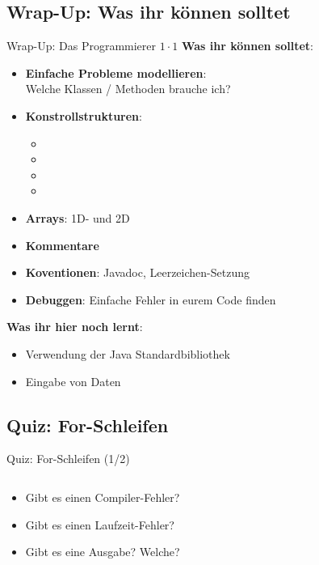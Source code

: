 \documentclass[usepdftitle=false,hyperref={pdfpagelabels=false}]{beamer}
\begin{document}
\subsection{Wrap-Up: Was ihr können solltet}
\begin{frame}{Wrap-Up: Das Programmierer $1 \cdot 1$}
    \textbf{Was ihr können solltet}:
    \begin{itemize}
        \item \textbf{Einfache Probleme modellieren}:\\
              Welche Klassen / Methoden brauche ich?
        \item \textbf{Konstrollstrukturen}:
          \begin{itemize}
            \item {} 
            \item {}
            \item {}
            \item {}
          \end{itemize}
        \item \textbf{Arrays}: 1D- und 2D
        \item \textbf{Kommentare}
        \item \textbf{Koventionen}: Javadoc, Leerzeichen-Setzung
        \item \textbf{Debuggen}: Einfache Fehler in eurem Code finden
    \end{itemize}

    \textbf{Was ihr hier noch lernt}:
    \begin{itemize}
        \item Verwendung der Java Standardbibliothek
        \item Eingabe von Daten
    \end{itemize}
\end{frame}

\subsection{Quiz: For-Schleifen}
\begin{frame}{Quiz: For-Schleifen (1/2)}
    \inputminted[linenos=true, numbersep=5pt, tabsize=4, fontsize=\small, label=QuizFor.java, frame=lines]{java}{QuizFor.java}
    \begin{itemize}
        \item Gibt es einen Compiler-Fehler?
        \item Gibt es einen Laufzeit-Fehler?
        \item Gibt es eine Ausgabe? Welche?
    \end{itemize}
\end{frame}
\end{document}
